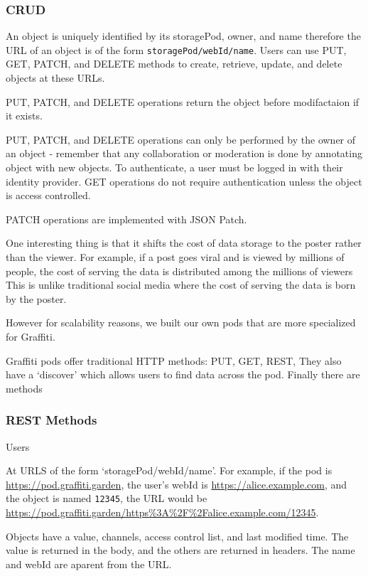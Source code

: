 \subsubsection{CRUD}

An object is uniquely identified by its storagePod, owner, and name
therefore the URL of an object is of the form \texttt{storagePod/webId/name}.
Users can use PUT, GET, PATCH, and DELETE methods to create, retrieve, update, and delete objects
at these URLs.

PUT, PATCH, and DELETE operations return the object before modifactaion if it exists.

PUT, PATCH, and DELETE operations can only be performed by the owner of an object
- remember that any collaboration or moderation is done by annotating object with new objects.
To authenticate, a user must be logged in with their identity provider.
GET operations do not require authentication unless the object is access controlled.

PATCH operations are implemented with JSON Patch.




One interesting thing is that it shifts the cost of data storage to the poster
rather than the viewer.
For example, if a post goes viral and is viewed by millions of people,
the cost of serving the data is distributed among the millions of viewers
This is unlike traditional social media where the cost of serving the data
is born by the poster.


However for scalability reasons,
we built our own pods that are more specialized for Graffiti.

Graffiti pods offer traditional HTTP methods: PUT, GET, REST,
They also have a `discover' which allows users to find data across the pod.
Finally there are methods

\subsubsection{REST Methods}

Users

At URLS of the form `storagePod/webId/name'.
For example, if the pod is \url{https://pod.graffiti.garden},
the user's webId is \url{https://alice.example.com},
and the object is named \texttt{12345},
the URL would be \url{https://pod.graffiti.garden/https\%3A\%2F\%2Falice.example.com/12345}.

Objects have a value, channels, access control list, and last modified time.
The value is returned in the body,
and the others are returned in headers.
The name and webId are aparent from the URL.


